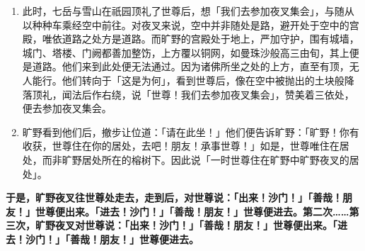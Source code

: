 \begin{enumerate}
\item 此时，七岳与雪山在祇园顶礼了世尊后，想「我们去参加夜叉集会」，与随从以种种车乘经空中前往。对夜叉来说，空中并非随处是路，避开处于空中的宫殿，唯依道路之处方是道路。而旷野的宫殿处于地上，严加守护，围有城墙，城门、塔楼、门阙都善加整饬，上方覆以铜网，如曼珠沙般高三由旬，其上便是道路。他们来到此处便无法通过。因为诸佛所坐之处的上方，直至有顶，无人能行。他们转向于「这是为何」，看到世尊后，像在空中被抛出的土块般降落顶礼，闻法后作右绕，说「世尊！我们去参加夜叉集会」，赞美着三依处，便去参加夜叉集会。
\item 旷野看到他们后，撤步让位道：「请在此坐！」他们便告诉旷野：「旷野！你有收获，世尊住在你的居处，去吧！朋友！承事世尊！」如是，世尊唯住在居处，而非旷野居处所在的榕树下。因此说「一时世尊住在旷野中旷野夜叉的居处」。\end{enumerate}

\textbf{于是，旷野夜叉往世尊处走去，走到后，对世尊说：「出来！沙门！」「善哉！朋友！」世尊便出来。「进去！沙门！」「善哉！朋友！」世尊便进去。第二次……第三次，旷野夜叉对世尊说：「出来！沙门！」「善哉！朋友！」世尊便出来。「进去！沙门！」「善哉！朋友！」世尊便进去。}

